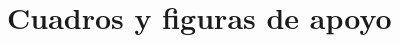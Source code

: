\clearpage
\appendix
\renewcommand{\thetable}{A\arabic{table}}
\renewcommand{\thefigure}{A\arabic{figure}}
\renewcommand{\theHtable}{appendix.table.\arabic{table}}
\renewcommand{\theHfigure}{appendix.figure.\arabic{figure}}
\setcounter{table}{0}
\setcounter{figure}{0}

\section{Cuadros y figuras de apoyo}\label{sec:apendice_cuadros}


